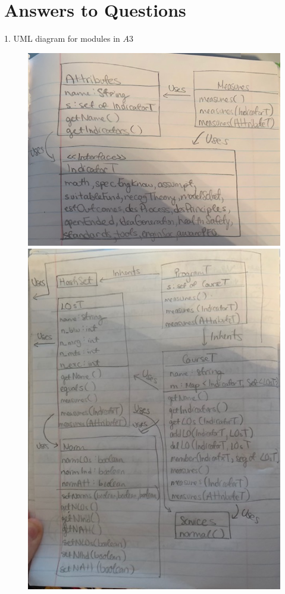 \documentclass[12pt]{article}
\begin{document}
\newpage

\section* {Answers to Questions}

\item 1. UML diagram for modules in $A3$

\begin{figure}[ht]
\centering
\begin{minipage}[b]{0.45\linewidth}
	\includegraphics[scale=0.3]{IMG_3018}
\end{minipage}
	\quad
\begin{minipage}[b]{0.45\linewidth}
	\includegraphics[scale=0.3]{IMG_3017}
\end{minipage}
\end{figure}
\end{document}
